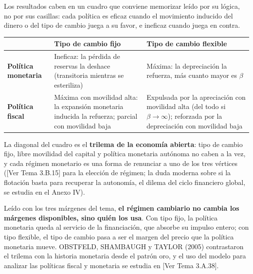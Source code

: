 \documentclass[10pt,a4paper]{article}
\newcommand{\authorfont}[1]{{\fontfamily{EBGaramond-TLF}\selectfont #1}}
\begin{document}
Los resultados caben en un cuadro que conviene memorizar leído por su lógica, no por sus casillas: cada política es eficaz cuando el movimiento inducido del dinero o del tipo de cambio juega a su favor, e ineficaz cuando juega en contra.

\begin{center}
{\small
\begin{tabular}{p{3.4cm} p{5.4cm} p{5.4cm}}
\hline
 & \textbf{Tipo de cambio fijo} & \textbf{Tipo de cambio flexible}\\
\hline
\textbf{Política monetaria} & Ineficaz: la pérdida de reservas la deshace (transitoria mientras se esteriliza) & Máxima: la depreciación la refuerza, más cuanto mayor es $\beta$\\[0.8em]
\textbf{Política fiscal} & Máxima con movilidad alta: la expansión monetaria inducida la refuerza; parcial con movilidad baja & Expulsada por la apreciación con movilidad alta (del todo si $\beta\to\infty$); reforzada por la depreciación con movilidad baja\\
\hline
\end{tabular}}
\end{center}

La diagonal del cuadro es el \textbf{trilema de la economía abierta}: tipo de cambio fijo, libre movilidad del capital y política monetaria autónoma no caben a la vez, y cada régimen monetario es una forma de renunciar a uno de los tres vértices ([\authorfont{Ver Tema 3.B.15}] para la elección de régimen; la duda moderna sobre si la flotación basta para recuperar la autonomía, el dilema del ciclo financiero global, se estudia en el Anexo IV).

Leído con los tres márgenes del tema, \textbf{el régimen cambiario no cambia los márgenes disponibles, sino quién los usa}. Con tipo fijo, la política monetaria queda al servicio de la financiación, que absorbe su impulso entero; con tipo flexible, el tipo de cambio pasa a ser el margen del precio que la política monetaria mueve. OBSTFELD, SHAMBAUGH y TAYLOR (2005) contrastaron el trilema con la historia monetaria desde el patrón oro, y el uso del modelo para analizar las políticas fiscal y monetaria se estudia en [\authorfont{Ver Tema 3.A.38}].
\end{document}
